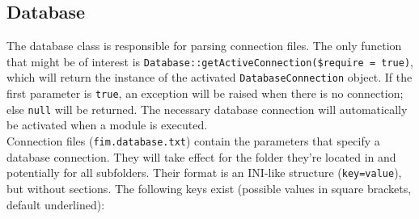 \documentclass{scrartcl}
\begin{document}
   \subsection{Database}
      The database class is responsible for parsing connection files. The only function that might be of interest is \lstinline!Database::getActiveConnection($require = true)!, which will return the instance of the activated \lstinline!DatabaseConnection! object. If the first parameter is \lstinline!true!, an exception will be raised when there is no connection; else \lstinline!null! will be returned. The necessary database connection will automatically be activated when a module is executed. \\
      Connection files (\texttt{fim.database.txt}) contain the parameters that specify a database connection. They will take effect for the folder they're located in and potentially for all subfolders. Their format is an INI-like structure (\texttt{key=value}), but without sections. The following keys exist (possible values in square brackets, default underlined):
\end{document}
